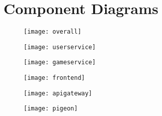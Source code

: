 \documentclass{article}
\begin{document}
\section*{Component Diagrams}

\begin{figure}[!ht]
  \centering
    \texttt{[image: overall]}
\end{figure}

\begin{figure}[!ht]
  \centering
    \texttt{[image: userservice]}
\end{figure}

\begin{figure}[!ht]
  \centering
    \texttt{[image: gameservice]}
\end{figure}

\begin{figure}[!ht]
  \centering
    \texttt{[image: frontend]}
\end{figure}

\begin{figure}[!ht]
  \centering
    \texttt{[image: apigateway]}
\end{figure}

\begin{figure}[!ht]
  \centering
    \texttt{[image: pigeon]}
\end{figure}
\end{document}
